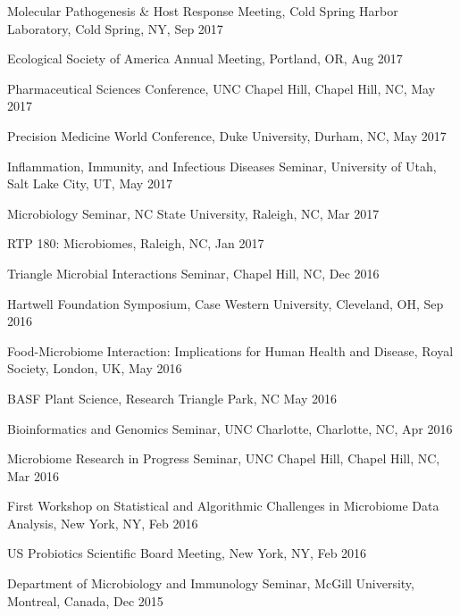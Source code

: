 \documentclass[overlapped,line,11pt]{res}
\begin{document}
\begin{resume}
\begin{revnumerate}[69]
\item {Molecular Pathogenesis \& Host Response Meeting, Cold Spring Harbor Laboratory, Cold Spring, NY, Sep 2017}

\item {Ecological Society of America Annual Meeting, Portland, OR, Aug 2017}

\item {Pharmaceutical Sciences Conference, UNC Chapel Hill, Chapel Hill, NC, May 2017}

\item {Precision Medicine World Conference, Duke University, Durham, NC, May 2017}

\item {Inflammation, Immunity, and Infectious Diseases Seminar, University of Utah, Salt Lake City, UT, May 2017}

\item {Microbiology Seminar, NC State University, Raleigh, NC, Mar 2017}

\item {RTP 180: Microbiomes, Raleigh, NC, Jan 2017}

\item {Triangle Microbial Interactions Seminar, Chapel Hill, NC, Dec 2016}

\item {Hartwell Foundation Symposium, Case Western University, Cleveland, OH, Sep 2016}

\item {Food-Microbiome Interaction: Implications for Human Health and Disease, Royal Society, London, UK, May 2016}

\item {BASF Plant Science, Research Triangle Park, NC May 2016}

\item {Bioinformatics and Genomics Seminar, UNC Charlotte, Charlotte, NC, Apr 2016}

\item {Microbiome Research in Progress Seminar, UNC Chapel Hill, Chapel Hill, NC, Mar 2016}

\item {First Workshop on Statistical and Algorithmic Challenges in Microbiome Data Analysis, New York, NY, Feb 2016}

\item {US Probiotics Scientific Board Meeting, New York, NY, Feb 2016}

\item {Department of Microbiology and Immunology Seminar, McGill University, Montreal, Canada, Dec 2015}


\end{revnumerate}
\end{resume}
\end{document}
